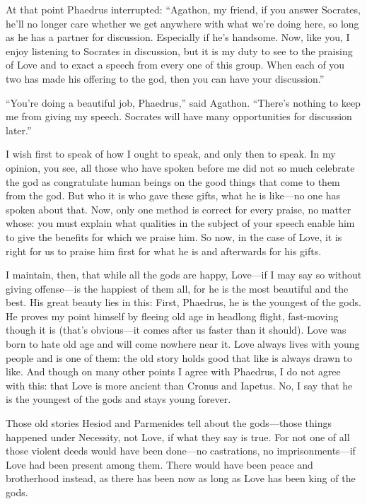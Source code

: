 At that point Phaedrus interrupted: “Agathon, my friend, if you answer
Socrates, he’ll no longer care whether we get anywhere with what we’re
doing here, so long as he has a partner for discussion. Especially if
he’s handsome. Now, like you, I enjoy listening to Socrates in
discussion, but it is my duty to see to the praising of Love and to
exact a speech from every one of this group. When each of you two has
made his offering to the god, then you can have your discussion.”

“You’re doing a beautiful job, Phaedrus,” said Agathon. “There’s nothing
to keep me from giving my speech. Socrates will have many opportunities
for discussion later.”

\blank[line]

I wish first to speak of how I ought to speak, and only then to speak.
In my opinion, you see, all those who have spoken before me did not so
much celebrate the god as congratulate human beings on the good things
that come to them from the god. But who it is who gave these gifts, what
he is like---no one has spoken about that. Now, only one method is
correct  for every praise, no matter whose: you must
explain what qualities in the subject of your speech enable him to give
the benefits for which we praise him. So now, in the case of Love, it is
right for us to praise him first for what he is and afterwards for his
gifts.

I maintain, then, that while all the gods are happy, Love---if I may say
so without giving offense---is the happiest of them all, for he is the
most beautiful and the best. His great beauty lies in this: First,
Phaedrus, he is  the youngest of the
gods. He proves my
point himself by fleeing old age in headlong flight, fast-moving though
it is (that’s obvious---it comes after us faster than it should). Love
was born to hate old age and will come nowhere near it. Love always
lives with young people and is one of them: the old story holds good
that like is always drawn to like. And though on many other points I
agree with Phaedrus, I do not agree with this: that  Love is more
ancient than Cronus and Iapetus. No, I say that he is the youngest of
the gods and stays young forever.

Those old stories Hesiod and Parmenides tell about the gods---those
things happened under Necessity, not Love, if what they say is true. For
not one of all those violent deeds would have been done---no
castrations, no imprisonments---if Love had been present among them.
There would have been peace and brotherhood instead, as there has been
now as long as Love has been king of the gods.

